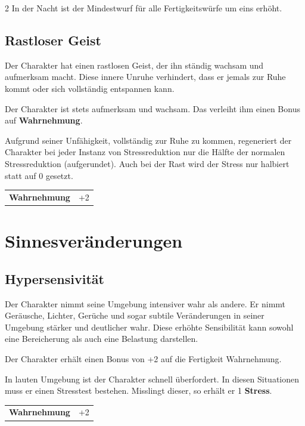 \begin{multicols}{2}
    In der Nacht ist der Mindestwurf für alle Fertigkeitswürfe um eins erhöht.


    \subsection*{Rastloser Geist}

    Der Charakter hat einen rastlosen Geist, der ihn ständig wachsam und aufmerksam macht. Diese innere Unruhe verhindert, dass er jemals zur Ruhe kommt oder sich vollständig entspannen kann.

    Der Charakter ist stets aufmerksam und wachsam. Das verleiht ihm einen Bonus auf \textbf{Wahrnehmung}.

    Aufgrund seiner Unfähigkeit, vollständig zur Ruhe zu kommen, regeneriert der Charakter bei jeder Instanz von Stressreduktion nur die Hälfte der normalen Stressreduktion (aufgerundet). Auch bei der Rast wird der Stress nur halbiert statt auf 0 gesetzt.

    \begin{tabular}{@{}ll@{}}
        \textbf{Wahrnehmung} & +2\\
    \end{tabular}

    \section{Sinnesveränderungen}

    \subsection*{Hypersensivität}

    Der Charakter nimmt seine Umgebung intensiver wahr als andere. Er nimmt Geräusche, Lichter, Gerüche und sogar subtile Veränderungen in seiner Umgebung stärker und deutlicher wahr. Diese erhöhte Sensibilität kann sowohl eine Bereicherung als auch eine Belastung darstellen.

    Der Charakter erhält einen Bonus von +2 auf die Fertigkeit Wahrnehmung.

    In lauten Umgebung ist der Charakter schnell überfordert. In diesen Situationen muss er einen Stresstest bestehen. Misslingt dieser, so erhält er 1 \textbf{Stress}.

    \begin{tabular}{@{}ll@{}}
        \textbf{Wahrnehmung} & +2\\
    \end{tabular}


\end{multicols}
